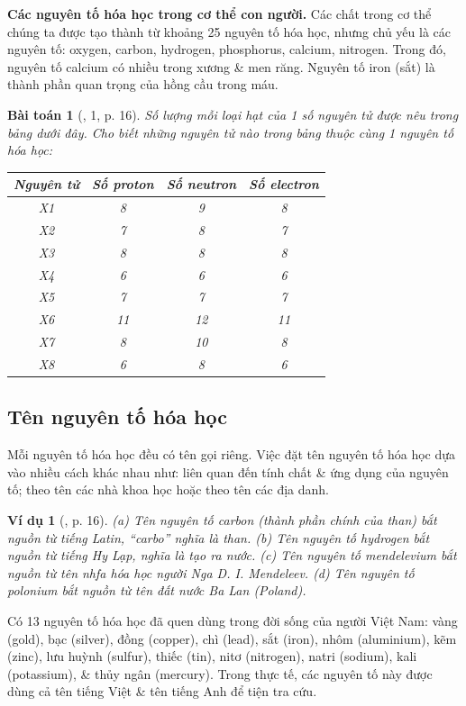 \documentclass{article}
\newtheorem{baitoan}{Bài toán}
\newtheorem{vidu}{Ví dụ}
\begin{document}
\textbf{Các nguyên tố hóa học trong cơ thể con người.} Các chất trong cơ thể chúng ta được tạo thành từ khoảng 25 nguyên tố hóa học, nhưng chủ yếu là các nguyên tố: oxygen, carbon, hydrogen, phosphorus, calcium, nitrogen. Trong đó, nguyên tố calcium có nhiều trong xương \& men răng. Nguyên tố iron (sắt) là thành phần quan trọng của hồng cầu trong máu.

\begin{baitoan}[\cite{SGK_KHTN_7_Canh_Dieu}, 1, p. 16]
	Số lượng mỗi loại hạt của 1 số nguyên tử được nêu trong bảng dưới đây. Cho biết những nguyên tử nào trong bảng thuộc cùng 1 nguyên tố hóa học:
	\begin{table}[H]
		\centering
		\begin{tabular}{|c|c|c|c|}
			\hline
			Nguyên tử & Số proton & Số neutron & Số electron \\
			\hline
			X1 & 8 & 9 & 8 \\
			\hline
			X2 & 7 & 8 & 7 \\
			\hline
			X3 & 8 & 8 & 8 \\
			\hline
			X4 & 6 & 6 & 6 \\
			\hline
			X5 & 7 & 7 & 7 \\
			\hline
			X6 & 11 & 12 & 11 \\
			\hline
			X7 & 8 & 10 & 8 \\
			\hline
			X8 & 6 & 8 & 6 \\
			\hline
		\end{tabular}
	\end{table}
\end{baitoan}

\subsection{Tên nguyên tố hóa học}
Mỗi nguyên tố hóa học đều có tên gọi riêng. Việc đặt tên nguyên tố hóa học dựa vào nhiều cách khác nhau như: liên quan đến tính chất \& ứng dụng của nguyên tố; theo tên các nhà khoa học hoặc theo tên các địa danh.

\begin{vidu}[\cite{SGK_KHTN_7_Canh_Dieu}, p. 16]
	(a) Tên nguyên tố carbon (thành phần chính của than) bắt nguồn từ tiếng Latin, ``carbo'' nghĩa là than. (b) Tên nguyên tố hydrogen bắt nguồn từ tiếng Hy Lạp, nghĩa là tạo ra nước. (c) Tên nguyên tố mendelevium bắt nguồn từ tên nhfa hóa học người Nga D. I. Mendeleev. (d) Tên nguyên tố polonium bắt nguồn từ tên đất nước Ba Lan (Poland).
\end{vidu}
Có 13 nguyên tố hóa học đã quen dùng trong đời sống của người Việt Nam: vàng (gold), bạc (silver), đồng (copper), chì (lead), sắt (iron), nhôm (aluminium), kẽm (zinc), lưu huỳnh (sulfur), thiếc (tin), nitơ (nitrogen), natri (sodium), kali (potassium), \& thủy ngân (mercury). Trong thực tế, các nguyên tố này được dùng cả tên tiếng Việt \& tên tiếng Anh để tiện tra cứu.
\end{document}
